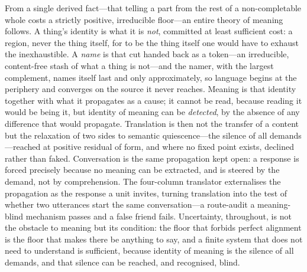 \documentclass[twocolumn,11pt,a4paper]{article}
\theoremstyle{sup}
\theoremstyle{definition}
\theoremstyle{remark}
\begin{document}
From a single derived fact---that telling a part from the rest of a
non-completable whole costs a strictly positive, irreducible floor---an entire
theory of meaning follows. A thing's identity is what it is \emph{not},
committed at least sufficient cost: a region, never the thing itself, for to be
the thing itself one would have to exhaust the inexhaustible. A \emph{name} is
that cut handed back as a token---an irreducible, content-free stash of what a
thing is not---and the namer, with the largest complement, names itself last and
only approximately, so language begins at the periphery and converges on the
source it never reaches. Meaning is that
identity together with what it propagates as a cause; it cannot be read, because
reading it would be being it, but identity of meaning can be \emph{detected}, by
the absence of any difference that would propagate. Translation is then not the
transfer of a content but the relaxation of two sides to semantic
quiescence---the silence of all demands---reached at positive residual of form,
and where no fixed point exists, declined rather than faked. Conversation is the
same propagation kept open: a response is forced precisely because no meaning can
be extracted, and is steered by the demand, not by comprehension. The
four-column translator externalises the propagation as the response a unit
invites, turning translation into the test of whether two utterances start the
same conversation---a route-audit a meaning-blind mechanism passes and a false
friend fails. Uncertainty, throughout, is not the obstacle to meaning but its
condition: the floor that forbids perfect alignment is the floor that makes there
be anything to say, and a finite system that does not need to understand is
sufficient, because identity of meaning is the silence of all demands, and that
silence can be reached, and recognised, blind.



\end{document}
